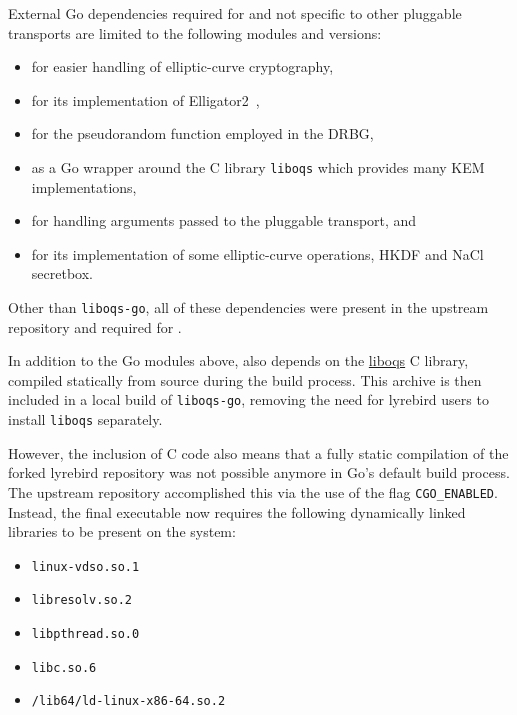 External Go dependencies required for \drivel{} and not specific to other pluggable transports are limited to the following modules and versions:
\begin{itemize}
    \item {} for easier handling of elliptic-curve cryptography,
    
    \item {} for its implementation of \textsf{Elligator2}~\cite{CCS:BHKL13},
    
    \item {} for the pseudorandom function employed in the DRBG,
    
    \item {} as a Go wrapper around the C library \texttt{liboqs} which provides many KEM implementations,
    
    \item {} for handling arguments passed to the pluggable transport, and
    
    \item {} for its implementation of some elliptic-curve operations, HKDF and NaCl secretbox.
\end{itemize}

Other than \texttt{liboqs-go}, all of these dependencies were present in the upstream repository and required for \obfsfour{}.

In addition to the Go modules above, \drivel{} also depends on the \href{https://github.com/open-quantum-safe/liboqs}{liboqs} C library, compiled statically from source during the build process. This archive is then included in a local build of \texttt{liboqs-go}, removing the need for lyrebird users to install \texttt{liboqs} separately.

However, the inclusion of C code also means that a fully static compilation of the forked lyrebird repository was not possible anymore in Go's default build process. The upstream repository accomplished this via the use of the flag \texttt{CGO\_ENABLED}. Instead, the final executable now requires the following dynamically linked libraries to be present on the system:
\begin{itemize}
    \item \texttt{linux-vdso.so.1}
    \item \texttt{libresolv.so.2}
    \item \texttt{libpthread.so.0}
    \item \texttt{libc.so.6}
    \item \texttt{/lib64/ld-linux-x86-64.so.2}
\end{itemize}


